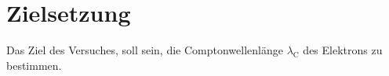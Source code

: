 \section{Zielsetzung}
Das Ziel des Versuches, soll sein, die Comptonwellenlänge $\lambda _\text{C}$ des Elektrons zu bestimmen.
